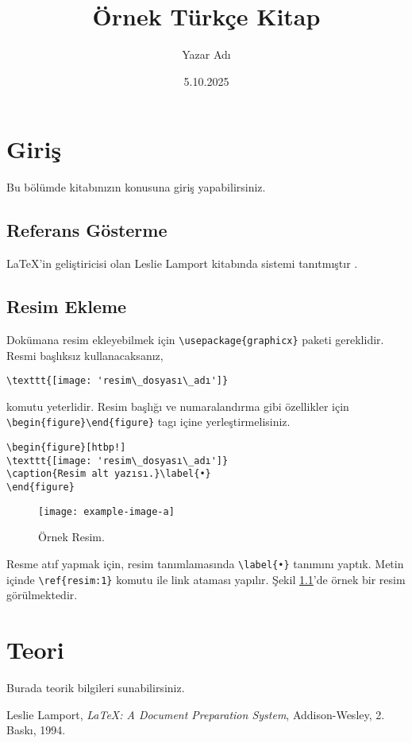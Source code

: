 \documentclass[a4paper,12pt,openany]{book}
\title{Örnek Türkçe Kitap}
\author{Yazar Adı}
\date{5.10.2025}
\begin{document}
\maketitle

\frontmatter
\tableofcontents

\mainmatter

\chapter{Giriş}
Bu bölümde kitabınızın konusuna giriş yapabilirsiniz.

\section{Referans Gösterme}
\LaTeX{}'in geliştiricisi olan Leslie Lamport  kitabında sistemi tanıtmıştır \cite{latexkitap}.

\section{Resim Ekleme}
Dokümana resim ekleyebilmek için \verb|\usepackage{graphicx}| paketi gereklidir. Resmi başlıksız kullanacaksanız,
\begin{verbatim}
\texttt{[image: 'resim\_dosyası\_adı']}
\end{verbatim} 
komutu yeterlidir. Resim başlığı ve numaralandırma gibi özellikler için \verb|\begin{figure}\end{figure}| tagı içine yerleştirmelisiniz.
\begin{verbatim}
\begin{figure}[htbp!]
\texttt{[image: 'resim\_dosyası\_adı']}
\caption{Resim alt yazısı.}\label{•}
\end{figure}
\end{verbatim}
\begin{figure}[htbp!]
\centering %
\texttt{[image: example-image-a]}
\caption{Örnek Resim.}\label{resim:1}
\end{figure}

Resme atıf yapmak için, resim tanımlamasında \verb|\label{•}| tanımını yaptık. Metin içinde \verb|\ref{resim:1}| komutu ile link ataması yapılır.
Şekil \ref{resim:1}'de örnek bir resim görülmektedir.

\chapter{Teori}
Burada teorik bilgileri sunabilirsiniz.


\begin{thebibliography}{9}

Leslie Lamport,
\textit{LaTeX: A Document Preparation System},
Addison-Wesley, 2. Baskı, 1994.

\end{thebibliography}
\end{document}
